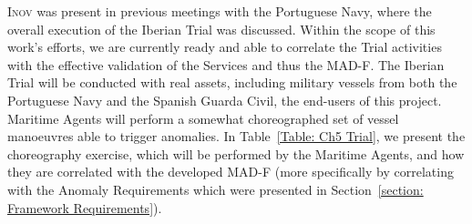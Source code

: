\textsc{Inov} was present in previous meetings with the Portuguese Navy, where the overall execution of the Iberian Trial was discussed. Within the scope of this work's efforts, we are currently ready and able to correlate the Trial activities with the effective validation of the Services and thus the MAD-F. The Iberian Trial will be conducted with real assets, including military vessels from both the Portuguese Navy and the Spanish Guarda Civil, the end-users of this project. Maritime Agents will perform a somewhat choreographed set of vessel manoeuvres able to trigger anomalies. In Table~\ref{Table: Ch5 Trial}, we present the choreography exercise, which will be performed by the Maritime Agents, and how they are correlated with the developed  MAD-F (more specifically by correlating with the Anomaly Requirements which were presented in Section~\ref{section: Framework Requirements}). 
